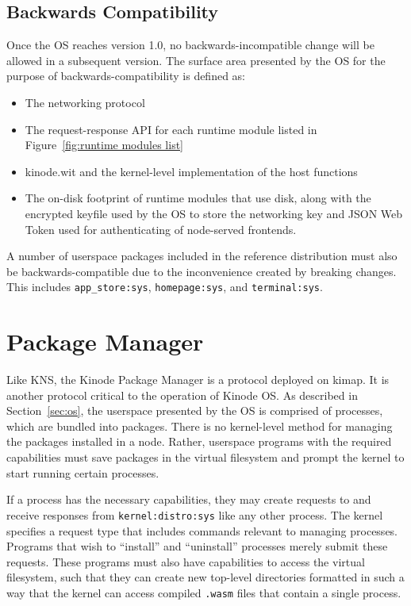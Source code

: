 \documentclass[runningheads]{llncs}
\begin{document}
\subsection{Backwards Compatibility}
\label{sec:osbackwardscompat}

Once the OS reaches version 1.0, no backwards-incompatible change will be allowed in a subsequent version.
The surface area presented by the OS for the purpose of backwards-compatibility is defined as:
\begin{itemize}
    \item The networking protocol
    \item The request-response API for each runtime module listed in Figure~\ref{fig:runtime modules list}
    \item kinode.wit and the kernel-level implementation of the host functions
    \item The on-disk footprint of runtime modules that use disk, along with the encrypted keyfile used by the OS to store the networking key and JSON Web Token used for authenticating of node-served frontends.
\end{itemize}

A number of userspace packages included in the reference distribution must also be backwards-compatible due to the inconvenience created by breaking changes.
This includes \verb|app_store:sys|, \verb|homepage:sys|, and \verb|terminal:sys|.

\section{Package Manager}
\label{sec:packagemanager}

Like KNS, the Kinode Package Manager is a protocol deployed on kimap.
It is another protocol critical to the operation of Kinode OS.
As described in Section~\ref{sec:os}, the userspace presented by the OS is comprised of processes, which are bundled into packages.
There is no kernel-level method for managing the packages installed in a node.
Rather, userspace programs with the required capabilities must save packages in the virtual filesystem and prompt the kernel to start running certain processes.

If a process has the necessary capabilities, they may create requests to and receive responses from \verb|kernel:distro:sys| like any other process.
The kernel specifies a request type that includes commands relevant to managing processes.
Programs that wish to ``install'' and ``uninstall'' processes merely submit these requests.
These programs must also have capabilities to access the virtual filesystem, such that they can create new top-level directories formatted in such a way that the kernel can access compiled \verb|.wasm| files that contain a single process.
\end{document}
